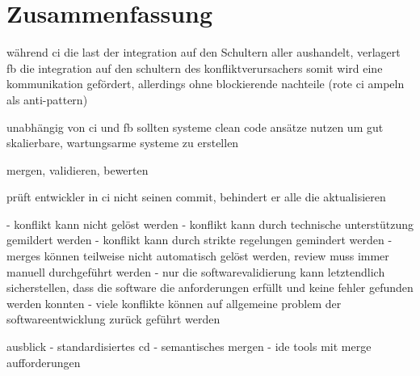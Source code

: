\chapter{Zusammenfassung}

während ci die last der integration auf den Schultern aller aushandelt, verlagert fb die integration auf den schultern des \glqq konfliktverursachers\grqq{} somit wird eine kommunikation gefördert, allerdings ohne blockierende nachteile (rote ci ampeln als anti-pattern)

unabhängig von ci und fb sollten systeme clean code ansätze nutzen um gut skalierbare, wartungsarme systeme zu erstellen


mergen, validieren, bewerten

prüft entwickler in ci nicht seinen commit, behindert er alle die aktualisieren

- konflikt kann nicht gelöst werden
- konflikt kann durch technische unterstützung gemildert werden
- konflikt kann durch strikte regelungen gemindert werden
- merges können teilweise nicht automatisch gelöst werden, review muss immer manuell durchgeführt werden
- nur die softwarevalidierung kann letztendlich sicherstellen, dass die software die anforderungen erfüllt und keine fehler gefunden werden konnten
- viele konflikte können auf allgemeine problem der softwareentwicklung zurück geführt werden


ausblick
- standardisiertes cd
- semantisches mergen
- ide tools mit merge aufforderungen